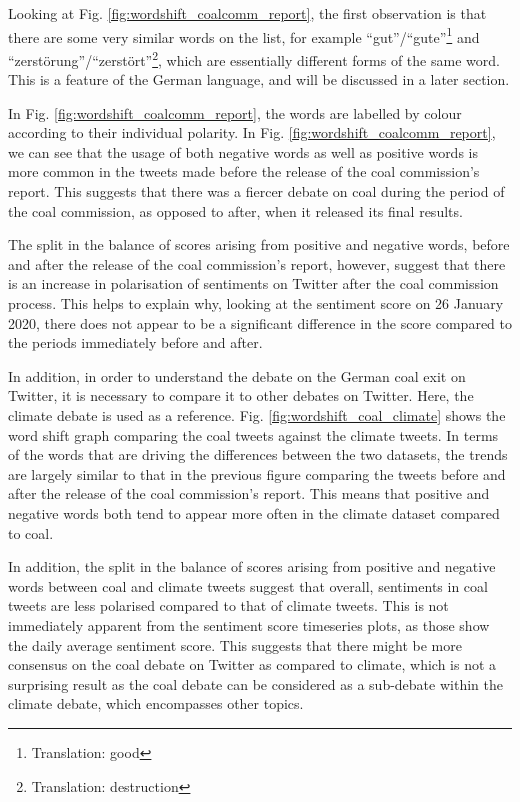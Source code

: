 \documentclass[12pt,onecolumn,twoside]{layout}
\begin{document}
Looking at Fig. \ref{fig:wordshift_coalcomm_report}, the first observation is that there are some very similar words on the list, for example ``gut''/``gute''\footnote{Translation: good} and ``zerstörung''/``zerstört''\footnote{Translation: destruction}, which are essentially different forms of the same word. This is a feature of the German language, and will be discussed in a later section. 

In Fig. \ref{fig:wordshift_coalcomm_report}, the words are labelled by colour according to their individual polarity. In Fig. \ref{fig:wordshift_coalcomm_report}, we can see that the usage of both negative words as well as positive words is more common in the tweets made before the release of the coal commission's report. This suggests that there was a fiercer debate on coal during the period of the coal commission, as opposed to after, when it released its final results. 

The split in the balance of scores arising from positive and negative words, before and after the release of the coal commission's report, however, suggest that there is an increase in polarisation of sentiments on Twitter after the coal commission process. This helps to explain why, looking at the sentiment score on 26 January 2020, there does not appear to be a significant difference in the score compared to the periods immediately before and after. 

In addition, in order to understand the debate on the German coal exit on Twitter, it is necessary to compare it to other debates on Twitter. Here, the climate debate is used as a reference. Fig. \ref{fig:wordshift_coal_climate} shows the word shift graph comparing the coal tweets against the climate tweets. In terms of the words that are driving the differences between the two datasets, the trends are largely similar to that in the previous figure comparing the tweets before and after the release of the coal commission's report. This means that positive and negative words both tend to appear more often in the climate dataset compared to coal. 

In addition, the split in the balance of scores arising from positive and negative words between coal and climate tweets suggest that overall, sentiments in coal tweets are less polarised compared to that of climate tweets. This is not immediately apparent from the sentiment score timeseries plots, as those show the daily average sentiment score. This suggests that there might be more consensus on the coal debate on Twitter as compared to climate, which is not a surprising result as the coal debate can be considered as a sub-debate within the climate debate, which encompasses other topics. 
\end{document}
